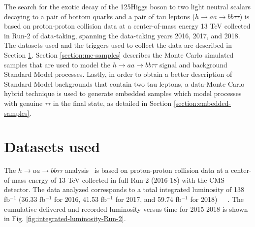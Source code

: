 The search for the exotic decay of the 125\GeV Higgs boson to two light neutral scalars decaying to a pair of bottom quarks and a pair of tau leptons ($h \rightarrow aa \rightarrow bb\tau\tau$) is based on proton-proton collision data at a center-of-mass energy 13 TeV collected in Run-2 of data-taking, spanning the data-taking years 2016, 2017, and 2018. The datasets used and the triggers used to collect the data are described in Section \ref{section:data-datasets}. Section \ref{section:mc-samples} describes the Monte Carlo simulated samples that are used to model the $h \rightarrow aa \rightarrow bb\tau\tau$ signal and background Standard Model processes. Lastly, in order to obtain a better description of Standard Model backgrounds that contain two tau leptons, a data-Monte Carlo hybrid technique is used to generate embedded samples which model processes with genuine $\tau\tau$ in the final state, as detailed in Section \ref{section:embedded-samples}.

\section{Datasets used}
\label{section:data-datasets}
The $h \rightarrow aa \rightarrow bb\tau\tau$ analysis~\cite{CMS-HIG-22-007} is based on proton-proton collision data at a center-of-mass energy of 13 TeV collected in full Run-2 (2016-18) with the CMS detector. The data analyzed corresponds to a total integrated luminosity of 138 fb$^{-1}$ (36.33 fb$^{-1}$ for 2016, 41.53 fb$^{-1}$ for 2017, and 59.74 fb$^{-1}$ for 2018)~\cite{CMS-LUM-17-001}~\cite{CMS-LUM-17-004}~\cite{CMS-LUM-18-002}. The cumulative delivered and recorded luminosity versus time for 2015-2018 is shown in Fig. \ref{fig:integrated-luminosity-Run-2}.

